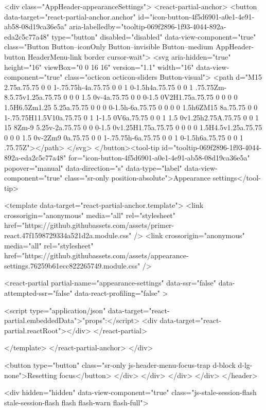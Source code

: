                 <div class="AppHeader-appearanceSettings">
    <react-partial-anchor>
      <button data-target="react-partial-anchor.anchor" id="icon-button-4f5d6901-a0e1-4e91-ab58-08d19ca36e5a" aria-labelledby="tooltip-069f2896-1f93-4044-892a-eda2c5c77a48" type="button" disabled="disabled" data-view-component="true" class="Button Button--iconOnly Button--invisible Button--medium AppHeader-button HeaderMenu-link border cursor-wait">  <svg aria-hidden="true" height="16" viewBox="0 0 16 16" version="1.1" width="16" data-view-component="true" class="octicon octicon-sliders Button-visual">
    <path d="M15 2.75a.75.75 0 0 1-.75.75h-4a.75.75 0 0 1 0-1.5h4a.75.75 0 0 1 .75.75Zm-8.5.75v1.25a.75.75 0 0 0 1.5 0v-4a.75.75 0 0 0-1.5 0V2H1.75a.75.75 0 0 0 0 1.5H6.5Zm1.25 5.25a.75.75 0 0 0 0-1.5h-6a.75.75 0 0 0 0 1.5h6ZM15 8a.75.75 0 0 1-.75.75H11.5V10a.75.75 0 1 1-1.5 0V6a.75.75 0 0 1 1.5 0v1.25h2.75A.75.75 0 0 1 15 8Zm-9 5.25v-2a.75.75 0 0 0-1.5 0v1.25H1.75a.75.75 0 0 0 0 1.5H4.5v1.25a.75.75 0 0 0 1.5 0v-2Zm9 0a.75.75 0 0 1-.75.75h-6a.75.75 0 0 1 0-1.5h6a.75.75 0 0 1 .75.75Z"></path>
</svg>
</button><tool-tip id="tooltip-069f2896-1f93-4044-892a-eda2c5c77a48" for="icon-button-4f5d6901-a0e1-4e91-ab58-08d19ca36e5a" popover="manual" data-direction="s" data-type="label" data-view-component="true" class="sr-only position-absolute">Appearance settings</tool-tip>

      <template data-target="react-partial-anchor.template">
        <link crossorigin="anonymous" media="all" rel="stylesheet" href="https://github.githubassets.com/assets/primer-react.47f1598729334a521d2a.module.css" />
<link crossorigin="anonymous" media="all" rel="stylesheet" href="https://github.githubassets.com/assets/appearance-settings.76259b61ecc822265749.module.css" />

<react-partial
  partial-name="appearance-settings"
  data-ssr="false"
  data-attempted-ssr="false"
  data-react-profiling="false"
>
  
  <script type="application/json" data-target="react-partial.embeddedData">{"props":{}}</script>
  <div data-target="react-partial.reactRoot"></div>
</react-partial>

      </template>
    </react-partial-anchor>
  </div>

          <button type="button" class="sr-only js-header-menu-focus-trap d-block d-lg-none">Resetting focus</button>
        </div>
      </div>
    </div>
  </div>
</header>

      <div hidden="hidden" data-view-component="true" class="js-stale-session-flash stale-session-flash flash flash-warn flash-full">
  
